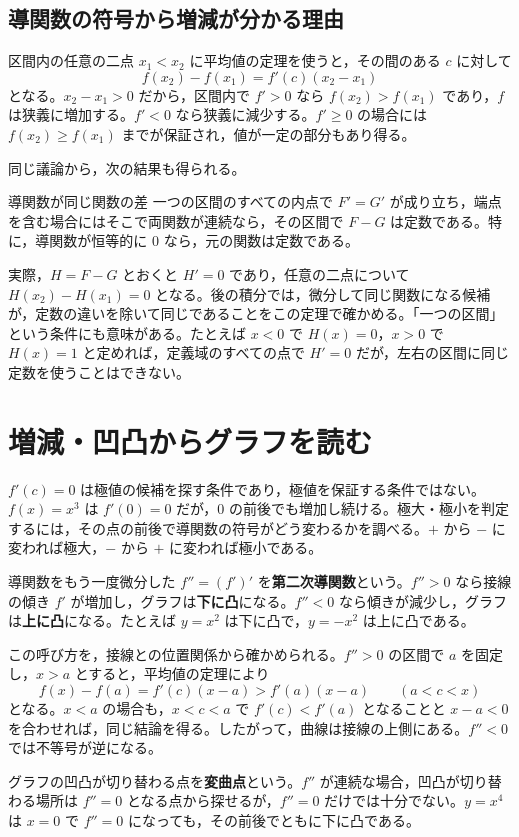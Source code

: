 \subsection{導関数の符号から増減が分かる理由}
区間内の任意の二点 $x_1<x_2$ に平均値の定理を使うと，その間のある $c$ に対して
\[
 f(x_2)-f(x_1)=f'(c)(x_2-x_1)
\]
となる。$x_2-x_1>0$ だから，区間内で $f'>0$ なら $f(x_2)>f(x_1)$ であり，$f$ は狭義に増加する。$f'<0$ なら狭義に減少する。$f'\ge0$ の場合には $f(x_2)\ge f(x_1)$ までが保証され，値が一定の部分もあり得る。

同じ議論から，次の結果も得られる。
\begin{theorem}{導関数が同じ関数の差}\label{定理:導関数同じ}
一つの区間のすべての内点で $F'=G'$ が成り立ち，端点を含む場合にはそこで両関数が連続なら，その区間で $F-G$ は定数である。特に，導関数が恒等的に $0$ なら，元の関数は定数である。
\end{theorem}

実際，$H=F-G$ とおくと $H'=0$ であり，任意の二点について $H(x_2)-H(x_1)=0$ となる。後の積分では，微分して同じ関数になる候補が，定数の違いを除いて同じであることをこの定理で確かめる。「一つの区間」という条件にも意味がある。たとえば $x<0$ で $H(x)=0$，$x>0$ で $H(x)=1$ と定めれば，定義域のすべての点で $H'=0$ だが，左右の区間に同じ定数を使うことはできない。

\section{増減・凹凸からグラフを読む}\label{節:増減凹凸}
$f'(c)=0$ は極値の候補を探す条件であり，極値を保証する条件ではない。$f(x)=x^3$ は $f'(0)=0$ だが，$0$ の前後でも増加し続ける。極大・極小を判定するには，その点の前後で導関数の符号がどう変わるかを調べる。$+$ から $-$ に変われば極大，$-$ から $+$ に変われば極小である。

導関数をもう一度微分した $f''=(f')'$ を\textbf{第二次導関数}という。$f''>0$ なら接線の傾き $f'$ が増加し，グラフは\textbf{下に凸}になる。$f''<0$ なら傾きが減少し，グラフは\textbf{上に凸}になる。たとえば $y=x^2$ は下に凸で，$y=-x^2$ は上に凸である。

この呼び方を，接線との位置関係から確かめられる。$f''>0$ の区間で $a$ を固定し，$x>a$ とすると，平均値の定理により
\[
 f(x)-f(a)=f'(c)(x-a)>f'(a)(x-a)
 \qquad(a<c<x)
\]
となる。$x<a$ の場合も，$x<c<a$ で $f'(c)<f'(a)$ となることと $x-a<0$ を合わせれば，同じ結論を得る。したがって，曲線は接線の上側にある。$f''<0$ では不等号が逆になる。

グラフの凹凸が切り替わる点を\textbf{変曲点}という。$f''$ が連続な場合，凹凸が切り替わる場所は $f''=0$ となる点から探せるが，$f''=0$ だけでは十分でない。$y=x^4$ は $x=0$ で $f''=0$ になっても，その前後でともに下に凸である。

